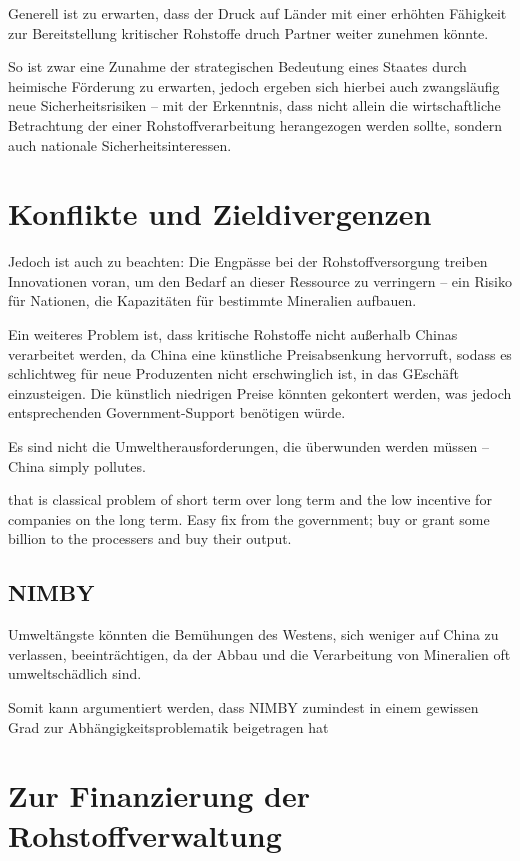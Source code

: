 \documentclass[12pt,a4paper,oneside]{book} %
\begin{document}
Generell ist zu erwarten, dass der Druck auf Länder mit einer erhöhten Fähigkeit zur Bereitstellung kritischer Rohstoffe druch Partner weiter zunehmen könnte. 

So ist zwar eine Zunahme der strategischen Bedeutung eines Staates durch heimische Förderung zu erwarten, jedoch ergeben sich hierbei auch zwangsläufig neue Sicherheitsrisiken -- mit der Erkenntnis, dass nicht allein die wirtschaftliche Betrachtung der einer Rohstoffverarbeitung herangezogen werden sollte, sondern auch nationale Sicherheitsinteressen.\autocite[Hier am Beispiel Schweden]{UI Report}

\section{Konflikte und Zieldivergenzen}

Jedoch ist auch zu beachten: Die Engpässe bei der Rohstoffversorgung treiben Innovationen voran, um den Bedarf an dieser Ressource zu verringern – ein Risiko für Nationen, die Kapazitäten für bestimmte Mineralien aufbauen.

Ein weiteres Problem ist, dass kritische Rohstoffe nicht außerhalb Chinas verarbeitet werden, da China eine künstliche Preisabsenkung hervorruft, sodass es schlichtweg für neue Produzenten nicht erschwinglich ist, in das GEschäft einzusteigen. Die künstlich niedrigen Preise könnten gekontert werden, was jedoch entsprechenden Government-Support benötigen würde.

Es sind nicht die Umweltherausforderungen, die überwunden werden müssen -- China simply pollutes.



that is classical problem of short term over long term and the low incentive for companies on the long term. Easy fix from the government; buy or grant some billion to the processers and buy their output.


\subsection{NIMBY}

Umweltängste könnten die Bemühungen des Westens, sich weniger auf China zu verlassen, beeinträchtigen, da der Abbau und die Verarbeitung von Mineralien oft umweltschädlich sind.

Somit kann argumentiert werden, dass NIMBY zumindest in einem gewissen Grad zur Abhängigkeitsproblematik beigetragen hat

\section{Zur Finanzierung der Rohstoffverwaltung}
\end{document}
